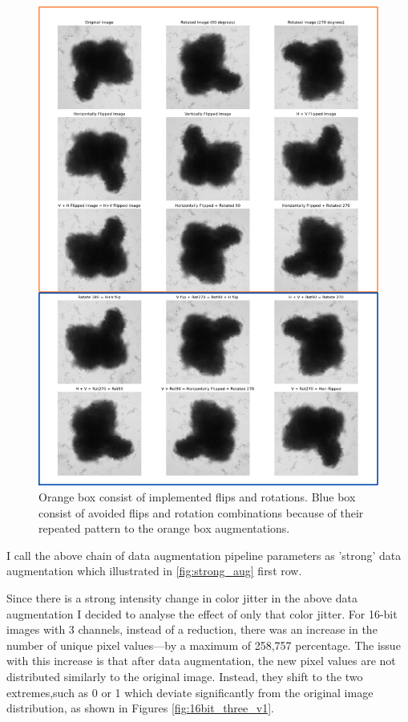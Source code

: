 \begin{figure}[H]
  \centering
  \includegraphics[scale=0.35]{figures/repeat.png} 
  \caption{Orange box consist of implemented flips and rotations. Blue box consist of avoided flips and rotation combinations because of their repeated pattern to
   the orange box augmentations.}
  \label{fig:repeat}
\end{figure}

I call the above chain of data augmentation pipeline parameters as 'strong' data augmentation which illustrated in \ref{fig:strong_aug} first row.

Since there is a strong intensity change in color jitter in the above data augmentation I decided to analyse the effect of only that color jitter. For 16-bit images
 with 3 channels, instead of a reduction, there was an increase in the number of unique pixel values—by a maximum of 258,757 percentage. The issue with this
  increase is that after data augmentation, the new pixel values are not distributed similarly to the original image. Instead, they shift to
 the two extremes,such as 0 or 1 which deviate significantly from the original image distribution, as shown in Figures \ref{fig:16bit_three_v1}.

